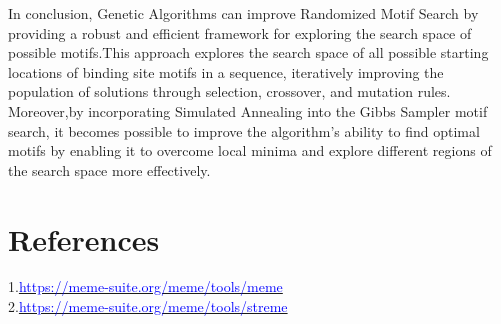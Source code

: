 \documentclass{article}
\begin{document}
\begin{Large}
In conclusion, Genetic Algorithms can improve Randomized Motif Search by providing a robust and efficient framework for exploring the search space of possible motifs.This approach explores the search space of all possible starting locations of binding site motifs in a sequence, iteratively improving the population of solutions through selection, crossover, and mutation rules.\\

Moreover,by incorporating Simulated Annealing into the Gibbs Sampler motif search, it becomes possible to improve the algorithm's ability to find optimal motifs by enabling it to overcome local minima and explore different regions of the search space more effectively.

\section{References}
1.\href{https://meme-suite.org/meme/tools/meme}{\textcolor{blue}{https://meme-suite.org/meme/tools/meme}}\\
2.\href{https://meme-suite.org/meme/tools/streme}{\textcolor{blue}{https://meme-suite.org/meme/tools/streme}}

\end{Large}
\end{document}
